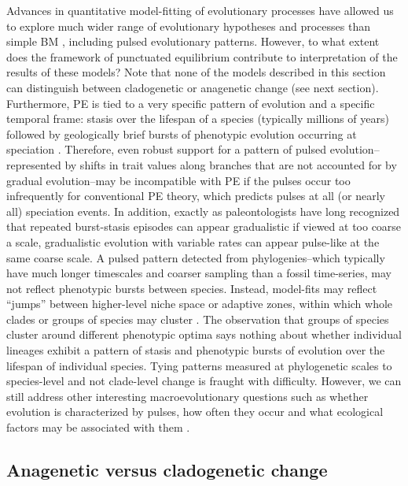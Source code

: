 Advances in quantitative model-fitting of evolutionary processes have allowed us to explore much wider range of evolutionary hypotheses and processes than simple BM \citep{PennellHarmon}, including pulsed evolutionary patterns. However, to what extent does the framework of punctuated equilibrium contribute to interpretation of the results of these models? Note that none of the models described in this section can distinguish between cladogenetic or anagenetic change (see next section). Furthermore, PE is tied to a very specific pattern of evolution and a specific temporal frame: stasis over the lifespan of a species (typically millions of years) followed by geologically brief bursts of phenotypic evolution occurring at speciation \citep{EldredgeGould1972, GouldEldredge1977, Gould2002}.  Therefore, even robust support for a pattern of pulsed evolution--represented by shifts in trait values along branches that are not accounted for by gradual evolution--may be incompatible with PE if the pulses occur too infrequently for conventional PE theory, which predicts pulses at all (or nearly all) speciation events. In addition, exactly as paleontologists have long recognized that repeated burst-stasis episodes can appear gradualistic if viewed at too coarse a scale, gradualistic evolution with variable rates can appear pulse-like at the same coarse scale. A pulsed pattern detected from phylogenies--which typically have much longer timescales and coarser sampling than a fossil time-series, may not reflect phenotypic bursts between species. Instead, model-fits may reflect ``jumps'' between higher-level niche space or adaptive zones, within which whole clades or groups of species may cluster \citep{Simpson1944, Hansen1997, Hansen2012, Eastmanjump}. The observation that groups of species cluster around different phenotypic optima says nothing about whether individual lineages exhibit a pattern of stasis and phenotypic bursts of evolution over the lifespan of individual species. Tying patterns measured at phylogenetic scales to species-level and not clade-level change is fraught with difficulty. However, we can still address other interesting macroevolutionary questions such as whether evolution is characterized by pulses, how often they occur and what ecological factors may be associated with them \citep{Eastmanjump}.

\subsection{Anagenetic versus cladogenetic change}

